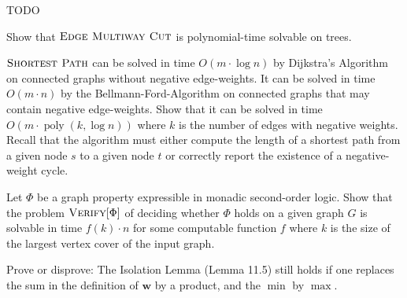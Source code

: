\documentclass{uebung_cs}
\begin{document}
TODO

\begin{exercise}
  Show that $\textsc{Edge Multiway Cut}$ is polynomial-time solvable on trees.
  \end{exercise}
  
  \begin{exercise}
  $\textsc{Shortest Path}$ can be solved in time $O(m\cdot \log n)$ by Dijkstra's Algorithm on connected graphs without negative edge-weights. It can be solved in time $O(m \cdot n)$ by the Bellmann-Ford-Algorithm on connected graphs that may contain negative edge-weights. Show that it can be solved in time $O(m\cdot \operatorname{poly}(k,\log n))$ where $k$ is the number of edges with negative weights. Recall that the algorithm must either compute the length of a shortest path from a given node $s$ to a given node $t$ or correctly report the existence of a negative-weight cycle.
  \end{exercise}
  
  \begin{exercise}
  Let $\Phi$ be a graph property expressible in monadic second-order logic. Show that the problem $\textsc{Verify}[\Phi]$ of deciding whether $\Phi$ holds on a given graph $G$ is solvable in time $f(k)\cdot n$ for some computable function $f$ where $k$ is the size of the largest vertex cover of the input graph.
  \end{exercise}
  
  \begin{exercise}
  Prove or disprove:
  The Isolation Lemma (Lemma 11.5) still holds if one replaces the sum in the definition of $\textbf{w}$ by a product,
  and the $\min$ by $\max$.
  \end{exercise}
  
\end{document}
